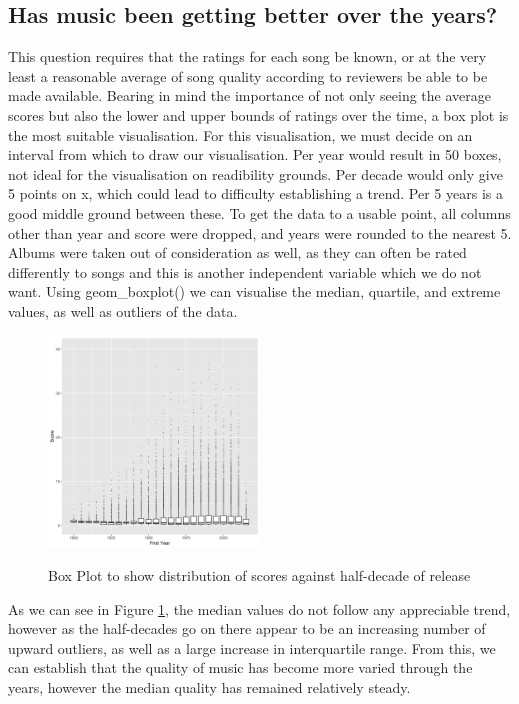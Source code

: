 \documentclass[12pt]{article}
\newcommand{\myfig}{\begin{figure}}
\begin{document}
  \subsection{Has music been getting better over the years?}
        This question requires that the ratings for each song be known, or at the very least a reasonable average of song quality according to reviewers be able to be made available.
        Bearing in mind the importance of not only seeing the average scores but also the lower and upper bounds of ratings over the time, a box plot is the most suitable visualisation.
        For this visualisation, we must decide on an interval from which to draw our visualisation.
        Per year would result in 50 boxes, not ideal for the visualisation on readibility grounds.
        Per decade would only give 5 points on x, which could lead to difficulty establishing a trend.
        Per 5 years is a good middle ground between these.
        To get the data to a usable point, all columns other than year and score were dropped, and years were rounded to the nearest 5.
        Albums were taken out of consideration as well, as they can often be rated differently to songs and this is another independent variable which we do not want.
        Using geom\_boxplot() we can visualise the median, quartile, and extreme values, as well as outliers of the data.\\
        \myfig
          \caption{Box Plot to show distribution of scores against half-decade of release}
          \includegraphics[width=0.5\textwidth]{yearScore}
          \label{fig:q1}
  \end{figure}
        As we can see in Figure \ref{fig:q1}, the median values do not follow any appreciable trend, however as the half-decades go on there appear to be an increasing number of upward outliers, as well as a large increase in interquartile range.
        From this, we can establish that the quality of music has become more varied through the years, however the median quality has remained relatively steady.
\end{document}
